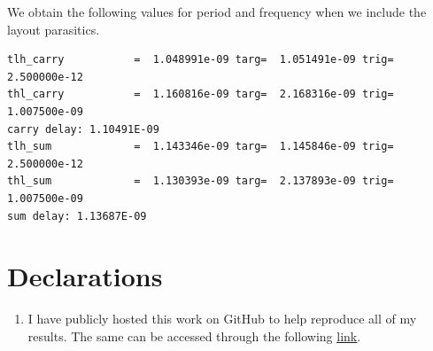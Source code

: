 \documentclass[12pt,a4paper]{article}
\begin{document}
\noindent We obtain the following values for period and frequency when we include the layout parasitics.
\begin{verbatim}
tlh_carry           =  1.048991e-09 targ=  1.051491e-09 trig=  2.500000e-12
thl_carry           =  1.160816e-09 targ=  2.168316e-09 trig=  1.007500e-09
carry delay: 1.10491E-09
tlh_sum             =  1.143346e-09 targ=  1.145846e-09 trig=  2.500000e-12
thl_sum             =  1.130393e-09 targ=  2.137893e-09 trig=  1.007500e-09
sum delay: 1.13687E-09
\end{verbatim}

\section{Declarations}
\begin{enumerate}
    \item I have publicly hosted this work on GitHub to help reproduce all of my results. The same can be accessed through the following \href{https://github.com/iamkarthikbk/ee5311-2025}{\underline{link}}.
\end{enumerate}
\end{document}
